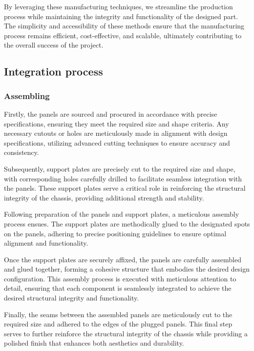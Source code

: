 By leveraging these manufacturing techniques, we streamline the production process while maintaining the integrity and functionality of the designed part. The simplicity and accessibility of these methods ensure that the manufacturing process remains efficient, cost-effective, and scalable, ultimately contributing to the overall success of the project.




\subsection{Integration process}


\subsubsection{Assembling}

Firstly, the panels are sourced and procured in accordance with precise specifications, ensuring they meet the required size and shape criteria. Any necessary cutouts or holes are meticulously made in alignment with design specifications, utilizing advanced cutting techniques to ensure accuracy and consistency.

Subsequently, support plates are precisely cut to the required size and shape, with corresponding holes carefully drilled to facilitate seamless integration with the panels. These support plates serve a critical role in reinforcing the structural integrity of the chassis, providing additional strength and stability.

Following preparation of the panels and support plates, a meticulous assembly process ensues. The support plates are methodically glued to the designated spots on the panels, adhering to precise positioning guidelines to ensure optimal alignment and functionality.

Once the support plates are securely affixed, the panels are carefully assembled and glued together, forming a cohesive structure that embodies the desired design configuration. This assembly process is executed with meticulous attention to detail, ensuring that each component is seamlessly integrated to achieve the desired structural integrity and functionality.

Finally, the seams between the assembled panels are meticulously cut to the required size and adhered to the edges of the plugged panels. This final step serves to further reinforce the structural integrity of the chassis while providing a polished finish that enhances both aesthetics and durability.

